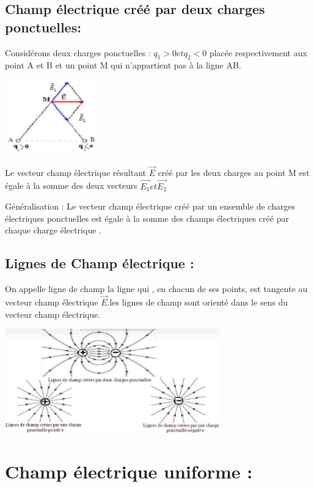 \documentclass[12pt]{article}
\begin{document}
\subsection{Champ électrique créé par deux charges ponctuelles:}
Considérons deux charges ponctuelles : $q_1>0 et q_2<0$ placée respectivement aux point A et B et un point M qui n’appartient pas
à la ligne AB.
\begin{center}
    \includegraphics[width=0.3\textwidth]{./img/img_05.png}
\end{center}



Le vecteur champ électrique résultant $\vec{E}$ créé par les deux charges au point M est égale à la somme des deux vecteurs $\vec{E_1} et 
\vec{E_2}$

Généralisation :
Le vecteur champ électrique créé par un ensemble de charges électriques ponctuelles est égale à la somme des champs électriques
créé par chaque charge électrique .

\subsection{Lignes de Champ électrique : }
On appelle ligne de champ la ligne qui , en chacun de ses points, est tangente au vecteur champ électrique $\vec{E}$.les lignes de champ
sont orienté dans le sens du vecteur champ électrique.

\begin{center}
    \includegraphics[width=0.7\textwidth]{./img/img_06.png}
\end{center}

\section{Champ électrique uniforme :}
\end{document}

